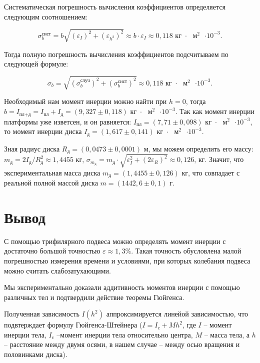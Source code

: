 \documentclass[a4paper,12pt]{article}
\begin{document}
	Систематическая погрешность вычисления коэффициентов определяется следующим соотношением:
	
	\begin{equation}
		\sigma^\text{сист}_b = b\sqrt{\left( \varepsilon_{I} \right)^2 + \left( \varepsilon_{h^2} \right)^2 } \approx b \cdot \varepsilon_I \approx 0,118 \text{  кг $\cdot$ $\text{м}^2$ $\cdot 10^{-3}$}.
	\end{equation}
	
	Тогда полную погрешность вычисления коэффициентов подсчитываем по следующей формуле:
	
	\begin{equation}
		\sigma_b = \sqrt{\left( \sigma_b^\text{случ} \right)^2 + \left( \sigma_b^\text{сист} \right)^2 } \approx 0,118 \text{  кг $\cdot$ $\text{м}^2$ $\cdot 10^{-3}$}.
	\end{equation}
	
	Необходимый нам момент инерции можно найти при $h = 0$, тогда $b = I_\text{пл+д} = I_\text{пл} + I_\text{д} = \left(9,327 \pm 0,118 \right) \text{  кг $\cdot$ $\text{м}^2$ $\cdot 10^{-3}$}$. Так как момент инерции платформы уже изветсен, и он равняется: $I_\text{пл} = \left(7,71 \pm 0,098 \right) \text{  кг $\cdot$ $\text{м}^2$ $\cdot 10^{-3}$}$, то момент инерции диска \underline{$I_\text{д} = \left(1,617 \pm 0,141 \right) \text{  кг $\cdot$ $\text{м}^2$ $\cdot 10^{-3}$}$}.
	
	Зная радиус диска $R_\text{д} = (0,0473 \pm 0,0001)$ м, мы можем определить его массу: $m_\text{д} = 2I_\text{д}/R_\text{д}^2 \approx 1,4455$ кг, $\sigma_{m_\text{д}} = m_\text{д} \cdot \sqrt{\varepsilon_I^2+\left(2\varepsilon_R\right)^2} \approx  0,126$, кг. Значит, что экспериментальная масса диска \underline{$m_\text{д} = \left(1,4455 \pm 0,126 \right)\text{ кг}$}, что совпадает с реальной полной массой диска $m = (1442,6 \pm 0,1)\text{ г}$. 
	
	\section{Вывод}
	
	С помощью трифилярного подвеса можно определять момент инерции с достаточно большой точностью $\varepsilon \approx 1,3\%$. Такая точность обусловлена малой погрешностью измерения времени и условиями, при которых колебания подвеса можно считать слабозатухающими.
	
	Мы экспериментально доказали аддитивность моментов инерции с помощью различных тел и подтвердили действие теоремы Гюйгенса.
	
	Полученная зависимость $I(h^2)$ аппроксимируется линейой зависимостью, что подвтерждает формулу Гюйгенса-Штейнера ($I = I_c + Mh^2$, где $I$ -- момент инерции тела, $I_c$ --момент инерции тела относительно центра, $M$ -- масса тела, а $h$ -- расстояние между двумя осями, в нашем случае -- между осью вращения и половинками диска).
	
	
\end{document}
